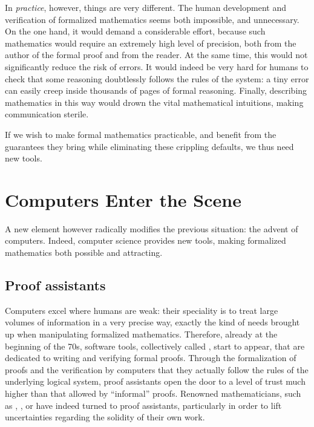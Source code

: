In \emph{practice}, however, things are very different. The human development and
verification of formalized mathematics%
seems both impossible, and unnecessary.
On the one hand, it would demand a considerable effort, because such mathematics would
require an extremely high level of precision, both from the author of the formal proof
and from the reader. At the same time, this would not significantly reduce the risk of
errors. It would indeed be very hard for humans to check that some reasoning doubtlessly
follows the rules of the system: a tiny error can easily creep inside thousands of pages
of formal reasoning. Finally, describing mathematics in this way would drown the vital
mathematical intuitions, making communication sterile.

If we wish to make formal mathematics practicable, and benefit from the guarantees
they bring while eliminating these crippling defaults, we thus need new tools.

\section{Computers Enter the Scene}
\label{sec:proof-assistants}

A new element however radically modifies the previous situation: the advent of computers.
Indeed, computer science provides new tools, making formalized mathematics both possible
and attracting.

\subsection{Proof assistants}

Computers excel where humans are weak: their speciality is to treat large volumes of
information in a very precise way, exactly the kind of needs brought up when manipulating
formalized mathematics. Therefore, already at the beginning of the 70s,%
%
%
software tools, collectively called , start to
appear, that are dedicated to writing and verifying formal proofs.
Through the formalization of proofs and the verification by computers that they
actually follow the rules of the underlying logical system, proof assistants open the
door to a level of trust much higher than that allowed by “informal” proofs.
Renowned mathematicians, such as ,
, or  have indeed
turned to proof assistants, particularly in order to lift uncertainties regarding the
solidity of their own work.

